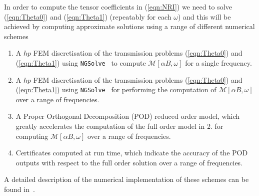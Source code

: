 In order to compute the tensor coefficients in (\ref{eqn:NRI}) we need to solve (\ref{eqn:Theta0}) and (\ref{eqn:Theta1}) (repeatably for each $\omega$) and this will be achieved by computing approximate solutions using a range of different numerical schemes
\begin{enumerate}

\item A $hp$ FEM discretisation of the transmission problems (\ref{eqn:Theta0}) and (\ref{eqn:Theta1}) using \texttt{NGSolve}~\cite{NGSolve,zaglmayrphd,netgendet} to compute ${\mathcal M}[\alpha B , \omega]$ for a single frequency.

\item A $hp$ FEM discretisation of the transmission problems (\ref{eqn:Theta0}) and (\ref{eqn:Theta1})  using \texttt{NGSolve}~\cite{NGSolve,zaglmayrphd,netgendet} for performing the  computation of ${\mathcal M}[\alpha B , \omega]$ over a range of frequencies.

\item A  Proper Orthogonal Decomposition (POD) reduced order model, which greatly accelerates the computation of the full order model in 2. for computing ${\mathcal M}[\alpha B , \omega]$ over a range of frequencies.

\item Certificates computed at run time, which indicate the accuracy of the POD outputs with respect to the full order solution over a range of frequencies.



\end{enumerate}

A detailed description of the numerical implementation of these schemes can be found in~\cite{wilsonledger2019}.

